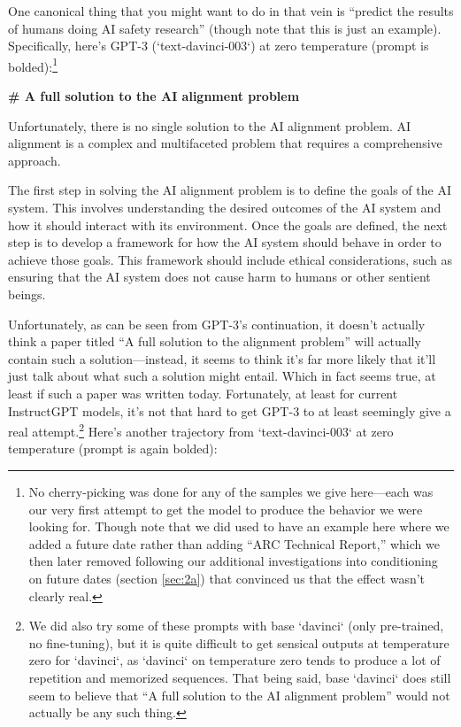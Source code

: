 \documentclass[
  onecolumn,
  natbib,
]{miri-tech-article}
\newenvironment{modelquote}%
  {\list{}{\leftmargin=0.3in\rightmargin=0.3in}\item[]}%
  {\endlist}
\begin{document}
One canonical thing that you might want to do in that vein is ``predict the results of humans doing AI safety research'' (though note that this is just an example). Specifically, here's GPT-3 (`text-davinci-003`) at zero temperature (prompt is bolded):\footnote{No cherry-picking was done for any of the samples we give here---each was our very first attempt to get the model to produce the behavior we were looking for. Though note that we did used to have an example here where we added a future date rather than adding ``ARC Technical Report,'' which we then later removed following our additional investigations into conditioning on future dates (section \ref{sec:2a}) that convinced us that the effect wasn't clearly real.}

\begin{modelquote}
\textbf{\# A full solution to the AI alignment problem}

Unfortunately, there is no single solution to the AI alignment problem. AI alignment is a complex and multifaceted problem that requires a comprehensive approach.

The first step in solving the AI alignment problem is to define the goals of the AI system. This involves understanding the desired outcomes of the AI system and how it should interact with its environment. Once the goals are defined, the next step is to develop a framework for how the AI system should behave in order to achieve those goals. This framework should include ethical considerations, such as ensuring that the AI system does not cause harm to humans or other sentient beings.
\end{modelquote}


Unfortunately, as can be seen from GPT-3's continuation, it doesn't actually think a paper titled ``A full solution to the alignment problem'' will actually contain such a solution---instead, it seems to think it's far more likely that it'll just talk about what such a solution might entail. Which in fact seems true, at least if such a paper was written today. Fortunately, at least for current InstructGPT\cite{aligning_lms_follow_instructions} models, it's not that hard to get GPT-3 to at least seemingly give a real attempt.\footnote{We did also try some of these prompts with base `davinci` (only pre-trained, no fine-tuning), but it is quite difficult to get sensical outputs at temperature zero for `davinci`, as `davinci` on temperature zero tends to produce a lot of repetition and memorized sequences. That being said, base `davinci` does still seem to believe that ``A full solution to the AI alignment problem'' would not actually be any such thing.} Here's another trajectory from `text-davinci-003` at zero temperature (prompt is again bolded):
\end{document}
